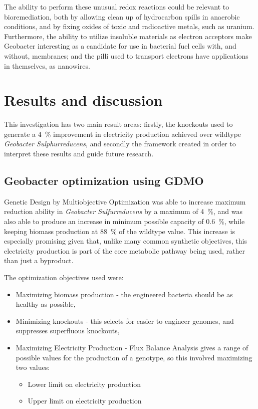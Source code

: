 \documentclass[a4paper,twocolumn]{article}
\begin{document}
The ability to perform these unusual redox reactions could be relevant to bioremediation, both by allowing clean up of hydrocarbon spills in anaerobic conditions, and by fixing oxides of toxic and radioactive metals, such as uranium. 
Furthermore, the ability to utilize insoluble materials as electron acceptors make Geobacter interesting as a candidate for use in bacterial fuel cells with, and without, membranes; and the pilli used to transport electrons have applications in themselves, as nanowires.

\section{Results and discussion}

This investigation has two main result areas: firstly, the knockouts used to generate a \SI{4}{\percent} improvement in electricity production achieved over wildtype {\it Geobacter Sulphurreducens}, and secondly the framework created in order to interpret these results and guide future research.

\subsection{Geobacter optimization using GDMO}
Genetic Design by Multiobjective Optimization was able to increase maximum  reduction ability in {\it Geobacter Sulfurreducens} by a maximum of  \SI{4}{\percent}, and was also able to produce an increase in minimum possible capacity of  \SI{0.6}{\percent}, while keeping biomass production at  \SI{88}{\percent} of the wildtype value. This increase is especially promising given that, unlike many common synthetic objectives, this electricity production is part of the core metabolic pathway being used, rather than just a byproduct. 

The optimization objectives used were:
\begin{itemize}
	\item Maximizing biomass production - the engineered bacteria should be as healthy as possible,
	\item Minimizing knockouts - this selects for easier to engineer genomes, and suppresses superfluous knockouts,
	\item Maximizing Electricity Production - Flux Balance Analysis gives a range of possible values for the production of a genotype, so this involved maximizing two values:
	\begin{itemize}
		\item Lower limit on electricity production
		\item Upper limit on electricity production
	\end{itemize}
\end{itemize}
\end{document}
